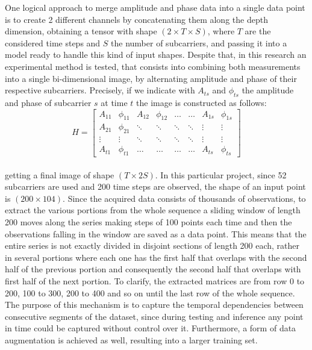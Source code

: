 \documentclass[binding=0.7cm, oneside]{sapthesis}
\begin{document}
One logical approach to merge amplitude and phase data into a single data point is to create 2 different channels by concatenating them along the depth dimension, obtaining a tensor with shape $( 2 \times T \times S)$, where $T$ are the considered
time steps and $S$ the number of subcarriers, and passing it into a model ready to handle this kind of input shapes. Despite that, in this research an experimental method is tested, that consists into combining both measurements into a single
bi-dimensional image, by alternating amplitude and phase of their respective subcarriers. Precisely, if we indicate with $A_{ts}$ and $\phi_{ts}$ the amplitude and phase of subcarrier $s$ at time $t$ the image is constructed as follows:
\\
\[
    H = \begin{bmatrix}
        A_{11} & \phi_{11} & A_{12} & \phi_{12} & \dots  & \dots  & A_{1s} & \phi_{1s} \\
        A_{21} & \phi_{21} & \ddots & \ddots    & \ddots & \ddots & \vdots & \vdots    \\
        \vdots & \vdots    & \ddots & \ddots    & \ddots & \ddots & \vdots & \vdots    \\
        A_{t1} & \phi_{t1} & \dots  & \dots     & \dots  & \dots  & A_{ts} & \phi_{ts}
    \end{bmatrix}
\]
\\
getting a final image of shape $(T \times 2S)$. In this particular project, since 52 subcarriers are used and 200 time steps are observed, the shape of an input point is $(200 \times 104)$.
Since the acquired data consists of thousands of observations, to extract the various portions from the whole sequence a sliding window of length 200 moves along the series making steps of 100 points each time
and then the observations falling in the window are saved as a data point. This means that the entire series is not exactly divided in disjoint sections of length 200 each, rather in several portions where each one has the first half that overlaps with the
second half of the previous portion and consequently the second half that overlaps with first half of the next portion. To clarify, the extracted matrices are from row 0 to 200, 100 to 300, 200 to 400 and so on until the last row of the whole sequence.
The purpose of this mechanism is to capture the temporal dependencies between consecutive segments of the dataset, since during testing and inference any point in time could be captured without control over it. Furthermore, a form of data augmentation
is achieved as well, resulting into a larger training set.
\end{document}

